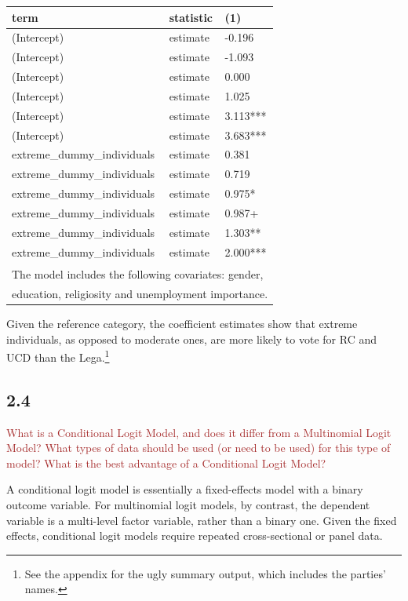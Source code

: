 \documentclass[
]{article}
\begin{document}
\begin{table}[!h]
\centering
\begin{tabular}[t]{lll}
\toprule
term & statistic & (1)\\
\midrule
(Intercept) & estimate & -0.196\\
(Intercept) & estimate & -1.093\\
(Intercept) & estimate & 0.000\\
(Intercept) & estimate & 1.025\\
(Intercept) & estimate & 3.113***\\
\addlinespace
(Intercept) & estimate & 3.683***\\
extreme\_dummy\_individuals & estimate & 0.381\\
extreme\_dummy\_individuals & estimate & 0.719\\
extreme\_dummy\_individuals & estimate & 0.975*\\
extreme\_dummy\_individuals & estimate & 0.987+\\
\addlinespace
extreme\_dummy\_individuals & estimate & 1.303**\\
extreme\_dummy\_individuals & estimate & 2.000***\\
\bottomrule
\multicolumn{3}{l}{\textsuperscript{} The model includes the following covariates: gender,}\\
\multicolumn{3}{l}{education, religiosity and unemployment importance.}\\
\end{tabular}
\end{table}

Given the reference category, the coefficient estimates show that
extreme individuals, as opposed to moderate ones, are more likely to
vote for RC and UCD than the Lega.\footnote{See the appendix for the
  ugly summary output, which includes the parties' names.}

\hypertarget{section-6}{%
\subsection{2.4}\label{section-6}}

\textcolor{brown}{What is a Conditional Logit Model, and does it differ from a Multinomial Logit Model? What types of data should be used (or need to be used) for this type of model? What is the best advantage of a Conditional Logit Model?}

A conditional logit model is essentially a fixed-effects model with a
binary outcome variable. For multinomial logit models, by contrast, the
dependent variable is a multi-level factor variable, rather than a
binary one. Given the fixed effects, conditional logit models require
repeated cross-sectional or panel data.
\end{document}
